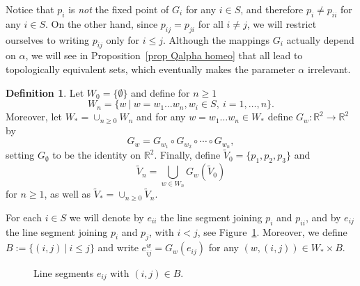 \documentclass[11pt]{amsart}
\theoremstyle{definition}
\newtheorem{definition}{Definition}[section]
\theoremstyle{remark}
\theoremstyle{example}
\numberwithin{equation}{section}
\begin{document}
Notice that $p_i$ is \textit{not} the fixed point of $G_i$ for any $i\in S$, and therefore $p_i\neq p_{ii}$ for any $i\in S$. On the other hand, since $p_{ij}=p_{ji}$ for all $i\neq j$, we will restrict ourselves to writing $p_{ij}$ only for $i\leq j$. Although the mappings $G_i$ actually depend on $\alpha$, we will see in Proposition~\ref{prop Qalpha homeo} that all lead to topologically equivalent sets, which eventually makes the parameter $\alpha$ irrelevant.

\begin{definition}
Let $W_0 = \{\emptyset\}$ and define for $n \geq 1$
\[
W_n = \{w~|~w = w_1\ldots{w_n}, w_i \in S,~i = 1, \ldots, n\}.
\]
Moreover, let $W_* = \cup_{n \geq 0} W_n$ and for any $w = w_1\ldots{w_n} \in W_*$ define $G_w\colon{{\mathbb R}}^2\to{{\mathbb R}}^2$ by
\[
G_w = G_{w_1}\circ G_{w_2}\circ\cdots\circ G_{w_n},
\]
setting $G_\emptyset$ to be the identity on ${{\mathbb R}}^2$. Finally, define $\widetilde{V}_0 = \{p_1, p_2, p_3\}$ and
\begin{equation}\label{eq def tilde V}
\widetilde{V}_n = \bigcup_{w \in W_n} G_w(\tilde{V}_0)
\end{equation}
for $n \ge 1$, as well as $\widetilde{V}_*=\cup_{n\geq 0}\widetilde{V}_n$.
\end{definition}
For each $i\in S$ we will denote by $e_{ii}$ the line segment joining $p_i$ and $p_{ii}$, and by $e_{ij}$ the line segment joining $p_{i}$ and $p_{j}$, with $i<j$, see Figure~\ref{fig segments}. Moreover, we define $B:= \{(i,j)~|~i\leq j\}$ and write $e_{ij}^w = G_w(e_{ij})$ for any $(w,(i,j))\in W_*\times B$.
\begin{figure}[H]
\centering
{}
\caption{Line segments $e_{ij}$ with $(i,j)\in B$.}
\label{fig segments}
\end{figure}
\end{document}
